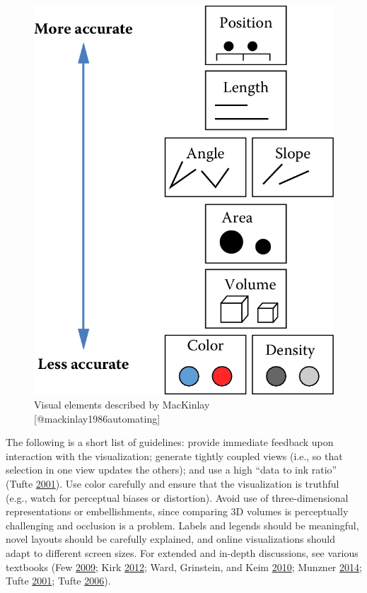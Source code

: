 \documentclass[]{krantz}
\begin{document}
\begin{figure}

{\centering \includegraphics[width=0.7\linewidth]{ChapterViz/figures/fig9-4} 

}

\caption{Visual elements described by MacKinlay [@mackinlay1986automating]}\label{fig:fig9-4}
\end{figure}

The following is a short list of guidelines: provide immediate feedback
upon interaction with the visualization; generate tightly coupled views
(i.e., so that selection in one view updates the others); and use a high
``data to ink ratio'' (Tufte
\protect\hyperlink{ref-edward2001visual}{2001}). Use color carefully and
ensure that the visualization is truthful (e.g., watch for perceptual
biases or distortion). Avoid use of three-dimensional representations or
embellishments, since comparing 3D volumes is perceptually challenging
and occlusion is a problem. Labels and legends should be meaningful,
novel layouts should be carefully explained, and online visualizations
should adapt to different screen sizes. For extended and in-depth
discussions, see various textbooks (Few
\protect\hyperlink{ref-few2009now}{2009}; Kirk
\protect\hyperlink{ref-kirk2012data}{2012}; Ward, Grinstein, and Keim
\protect\hyperlink{ref-ward2010interactive}{2010}; Munzner
\protect\hyperlink{ref-munzner2014visualization}{2014}; Tufte
\protect\hyperlink{ref-edward2001visual}{2001}; Tufte
\protect\hyperlink{ref-edward2006beauty}{2006}).
\end{document}
